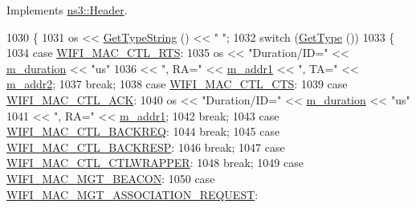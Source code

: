Implements \hyperlink{classns3_1_1Header_a2ce1df7579b2ade7bc7302357feac77a}{ns3\+::\+Header}.


\begin{DoxyCode}
1030 \{
1031   os << \hyperlink{classns3_1_1WifiMacHeader_ab41f17fe4a357d0cef9ae6de86bc7bf3}{GetTypeString} () << \textcolor{stringliteral}{" "};
1032   \textcolor{keywordflow}{switch} (\hyperlink{classns3_1_1WifiMacHeader_a393067652a2b6c06d645366912ddf748}{GetType} ())
1033     \{
1034     \textcolor{keywordflow}{case} \hyperlink{namespacens3_a9318472db39b35b2092de5c721e6ab0aa43ed89d21958665f84711a6b6d0fb75f}{WIFI\_MAC\_CTL\_RTS}:
1035       os << \textcolor{stringliteral}{"Duration/ID="} << \hyperlink{classns3_1_1WifiMacHeader_a7adb3f465d0b7474cdceefc8ab993513}{m\_duration} << \textcolor{stringliteral}{"us"}
1036          << \textcolor{stringliteral}{", RA="} << \hyperlink{classns3_1_1WifiMacHeader_a308c3d706ac2118142a76a261847629a}{m\_addr1} << \textcolor{stringliteral}{", TA="} << \hyperlink{classns3_1_1WifiMacHeader_a6476ca1eb2261edf7914c97a71743f1d}{m\_addr2};
1037       \textcolor{keywordflow}{break};
1038     \textcolor{keywordflow}{case} \hyperlink{namespacens3_a9318472db39b35b2092de5c721e6ab0aa529299bd6c8159e0dc3f56acb749eff4}{WIFI\_MAC\_CTL\_CTS}:
1039     \textcolor{keywordflow}{case} \hyperlink{namespacens3_a9318472db39b35b2092de5c721e6ab0aa94b81d2741a3a2ab30de5df6e04fc850}{WIFI\_MAC\_CTL\_ACK}:
1040       os << \textcolor{stringliteral}{"Duration/ID="} << \hyperlink{classns3_1_1WifiMacHeader_a7adb3f465d0b7474cdceefc8ab993513}{m\_duration} << \textcolor{stringliteral}{"us"}
1041          << \textcolor{stringliteral}{", RA="} << \hyperlink{classns3_1_1WifiMacHeader_a308c3d706ac2118142a76a261847629a}{m\_addr1};
1042       \textcolor{keywordflow}{break};
1043     \textcolor{keywordflow}{case} \hyperlink{namespacens3_a9318472db39b35b2092de5c721e6ab0aa1b3c29e4b46847a71ad8f3b45c747456}{WIFI\_MAC\_CTL\_BACKREQ}:
1044       \textcolor{keywordflow}{break};
1045     \textcolor{keywordflow}{case} \hyperlink{namespacens3_a9318472db39b35b2092de5c721e6ab0aaabd6e2bca4aa9279211a5e7d0c5c5afa}{WIFI\_MAC\_CTL\_BACKRESP}:
1046       \textcolor{keywordflow}{break};
1047     \textcolor{keywordflow}{case} \hyperlink{namespacens3_a9318472db39b35b2092de5c721e6ab0aa5c1d699609af2aadbf1d3cb727aa894e}{WIFI\_MAC\_CTL\_CTLWRAPPER}:
1048       \textcolor{keywordflow}{break};
1049     \textcolor{keywordflow}{case} \hyperlink{namespacens3_a9318472db39b35b2092de5c721e6ab0aa6bc0d1acc5d5b35462a68b8ad89870ab}{WIFI\_MAC\_MGT\_BEACON}:
1050     \textcolor{keywordflow}{case} \hyperlink{namespacens3_a9318472db39b35b2092de5c721e6ab0aaa492647f7cc9cf143b2c05cd9b943f8d}{WIFI\_MAC\_MGT\_ASSOCIATION\_REQUEST}:

\end{DoxyCode}
